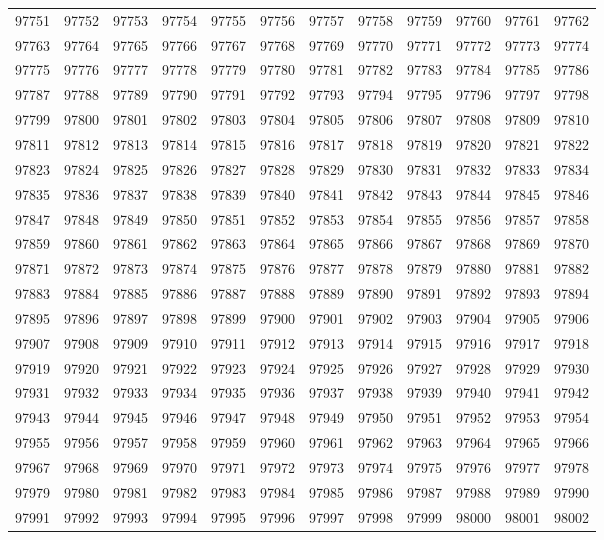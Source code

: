 \begin{center}
\begin{longtable}{llllllllllll}
97751 &97752 &97753 &97754 &97755 &97756 &97757 &97758 &97759 &97760 &97761 &97762 \\
97763 &97764 &97765 &97766 &97767 &97768 &97769 &97770 &97771 &97772 &97773 &97774 \\
97775 &97776 &97777 &97778 &97779 &97780 &97781 &97782 &97783 &97784 &97785 &97786 \\
97787 &97788 &97789 &97790 &97791 &97792 &97793 &97794 &97795 &97796 &97797 &97798 \\
97799 &97800 &97801 &97802 &97803 &97804 &97805 &97806 &97807 &97808 &97809 &97810 \\
97811 &97812 &97813 &97814 &97815 &97816 &97817 &97818 &97819 &97820 &97821 &97822 \\
97823 &97824 &97825 &97826 &97827 &97828 &97829 &97830 &97831 &97832 &97833 &97834 \\
97835 &97836 &97837 &97838 &97839 &97840 &97841 &97842 &97843 &97844 &97845 &97846 \\
97847 &97848 &97849 &97850 &97851 &97852 &97853 &97854 &97855 &97856 &97857 &97858 \\
97859 &97860 &97861 &97862 &97863 &97864 &97865 &97866 &97867 &97868 &97869 &97870 \\
97871 &97872 &97873 &97874 &97875 &97876 &97877 &97878 &97879 &97880 &97881 &97882 \\
97883 &97884 &97885 &97886 &97887 &97888 &97889 &97890 &97891 &97892 &97893 &97894 \\
97895 &97896 &97897 &97898 &97899 &97900 &97901 &97902 &97903 &97904 &97905 &97906 \\
97907 &97908 &97909 &97910 &97911 &97912 &97913 &97914 &97915 &97916 &97917 &97918 \\
97919 &97920 &97921 &97922 &97923 &97924 &97925 &97926 &97927 &97928 &97929 &97930 \\
97931 &97932 &97933 &97934 &97935 &97936 &97937 &97938 &97939 &97940 &97941 &97942 \\
97943 &97944 &97945 &97946 &97947 &97948 &97949 &97950 &97951 &97952 &97953 &97954 \\
97955 &97956 &97957 &97958 &97959 &97960 &97961 &97962 &97963 &97964 &97965 &97966 \\
97967 &97968 &97969 &97970 &97971 &97972 &97973 &97974 &97975 &97976 &97977 &97978 \\
97979 &97980 &97981 &97982 &97983 &97984 &97985 &97986 &97987 &97988 &97989 &97990 \\
97991 &97992 &97993 &97994 &97995 &97996 &97997 &97998 &97999 &98000 &98001 &98002 \\

\end{longtable}
\end{center}
